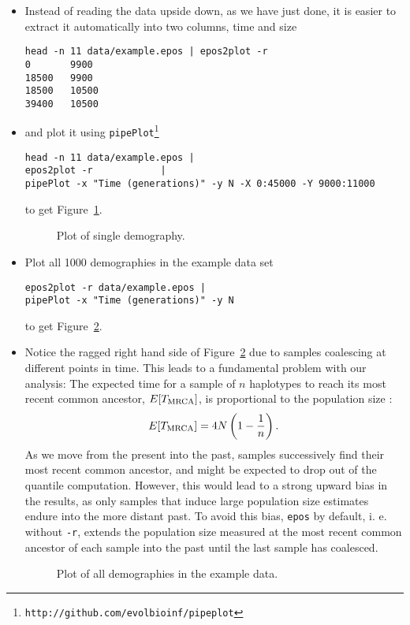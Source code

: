 \documentclass[a4paper, english]{article}
\newcommand{\ty}{\texttt}
\begin{document}
\begin{itemize}
\item Instead of reading the data upside down, as we have just done,
  it is easier to extract it automatically into two columns, time and size
\begin{verbatim}
head -n 11 data/example.epos | epos2plot -r
0       9900
18500   9900
18500   10500
39400   10500
\end{verbatim}
\item and plot it using \ty{pipePlot}\footnote{\ty{http://github.com/evolbioinf/pipeplot}}
\begin{verbatim}
head -n 11 data/example.epos | 
epos2plot -r            | 
pipePlot -x "Time (generations)" -y N -X 0:45000 -Y 9000:11000
\end{verbatim}
to get Figure~\ref{fig:sin}.

\begin{figure}
\begin{center}
\end{center}
\caption{Plot of single demography.}\label{fig:sin}
\end{figure}

\item Plot all 1000 demographies in the example data set
\begin{verbatim}
epos2plot -r data/example.epos |
pipePlot -x "Time (generations)" -y N
\end{verbatim}
to get Figure~\ref{fig:all}.

\item Notice the ragged right hand side of Figure~\ref{fig:all} due to
  samples coalescing at different points in time. This leads to a
  fundamental problem with our analysis: The expected time for a
  sample of $n$ haplotypes to reach its most recent common ancestor,
  $E[T_{\rm MRCA}]$,  is
  proportional to the population size \cite[p. 76]{wak09:coa}:
\[
E[T_{\rm MRCA}]=4N\left(1-\frac{1}{n}\right).
\]
As we move from the present into the past, samples successively find
their most recent common ancestor, and might be expected to drop out
of the quantile computation. However, this would lead to a strong
upward bias in the results, as only samples that induce large
population size estimates endure into the more distant past. To avoid this
bias, \ty{epos} by default, i. e. without \ty{-r}, extends the
population size measured at the most recent common ancestor of each
sample into the past until the last sample has coalesced.


\begin{figure}
\begin{center}
\end{center}
\caption{Plot of all demographies in the example data.}\label{fig:all}
\end{figure}


\end{itemize}
\end{document}
